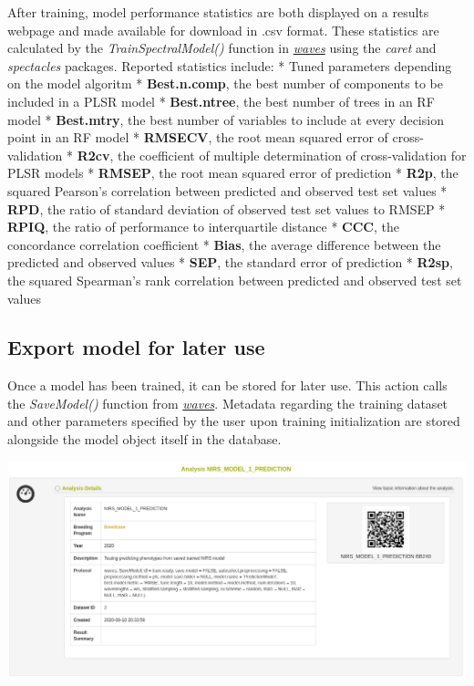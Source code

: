 \documentclass[
  12pt,
]{book}
\begin{document}
After training, model performance statistics are both displayed on a results webpage and made available for download in .csv format. These statistics are calculated by the \emph{TrainSpectralModel()} function in \href{https://CRAN.R-project.org/package=waves}{\emph{waves}} using the \emph{caret} and \emph{spectacles} packages. Reported statistics include: * Tuned parameters depending on the model algoritm * \textbf{Best.n.comp}, the best number of components to be included in a PLSR model * \textbf{Best.ntree}, the best number of trees in an RF model * \textbf{Best.mtry}, the best number of variables to include at every decision point in an RF model * \textbf{RMSECV}, the root mean squared error of cross-validation * \textbf{R2cv}, the coefficient of multiple determination of cross-validation for PLSR models * \textbf{RMSEP}, the root mean squared error of prediction * \textbf{R2p}, the squared Pearson's correlation between predicted and observed test set values * \textbf{RPD}, the ratio of standard deviation of observed test set values to RMSEP * \textbf{RPIQ}, the ratio of performance to interquartile distance * \textbf{CCC}, the concordance correlation coefficient * \textbf{Bias}, the average difference between the predicted and observed values * \textbf{SEP}, the standard error of prediction * \textbf{R2sp}, the squared Spearman's rank correlation between predicted and observed test set values

\hypertarget{export-model-for-later-use}{%
\subsection{Export model for later use}\label{export-model-for-later-use}}

Once a model has been trained, it can be stored for later use. This action calls the \emph{SaveModel()} function from \href{https://CRAN.R-project.org/package=waves}{\emph{waves}}. Metadata regarding the training dataset and other parameters specified by the user upon training initialization are stored alongside the model object itself in the database.

\begin{center}\includegraphics[width=0.95\linewidth]{assets/images/manage_NIRS_export_model} \end{center}
\end{document}

